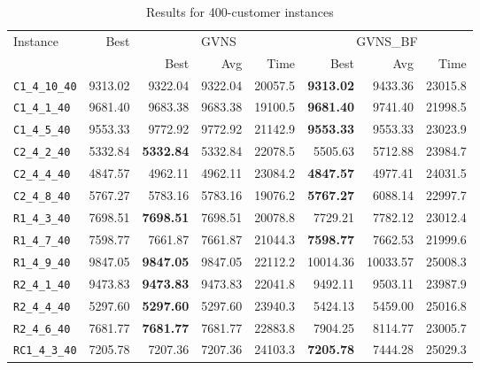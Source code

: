 \begin{table}[ht]
\centering
\small
\setlength{\tabcolsep}{5pt}
\caption{Results for 400-customer instances}
\vspace{4mm}
\begin{adjustbox}{width=\textwidth}
\begin{tabular}{l r r r r @{\hspace{8pt}} r r r @{\hspace{8pt}}}
\toprule
\multirow{2}{*}{Instance} & \multirow{2}{*}{Best} & \multicolumn{3}{c}{GVNS} & \multicolumn{3}{c}{GVNS\_BF} \\
\cmidrule(lr){3-5} \cmidrule(lr){6-8}
 &  & Best & Avg & Time & Best & Avg & Time \\
\midrule
\texttt{C1\_4\_10\_40} & 9313.02 & 9322.04 & 9322.04 & 20057.5 & \textbf{9313.02} & 9433.36 & 23015.8 \\
\texttt{C1\_4\_1\_40} & 9681.40 & 9683.38 & 9683.38 & 19100.5 & \textbf{9681.40} & 9741.40 & 21998.5 \\
\texttt{C1\_4\_5\_40} & 9553.33 & 9772.92 & 9772.92 & 21142.9 & \textbf{9553.33} & 9553.33 & 23023.9 \\
\texttt{C2\_4\_2\_40} & 5332.84 & \textbf{5332.84} & 5332.84 & 22078.5 & 5505.63 & 5712.88 & 23984.7 \\
\texttt{C2\_4\_4\_40} & 4847.57 & 4962.11 & 4962.11 & 23084.2 & \textbf{4847.57} & 4977.41 & 24031.5 \\
\texttt{C2\_4\_8\_40} & 5767.27 & 5783.16 & 5783.16 & 19076.2 & \textbf{5767.27} & 6088.14 & 22997.7 \\
\texttt{R1\_4\_3\_40} & 7698.51 & \textbf{7698.51} & 7698.51 & 20078.8 & 7729.21 & 7782.12 & 23012.4 \\
\texttt{R1\_4\_7\_40} & 7598.77 & 7661.87 & 7661.87 & 21044.3 & \textbf{7598.77} & 7662.53 & 21999.6 \\
\texttt{R1\_4\_9\_40} & 9847.05 & \textbf{9847.05} & 9847.05 & 22112.2 & 10014.36 & 10033.57 & 25008.3 \\
\texttt{R2\_4\_1\_40} & 9473.83 & \textbf{9473.83} & 9473.83 & 22041.8 & 9492.11 & 9503.11 & 23987.9 \\
\texttt{R2\_4\_4\_40} & 5297.60 & \textbf{5297.60} & 5297.60 & 23940.3 & 5424.13 & 5459.00 & 25016.8 \\
\texttt{R2\_4\_6\_40} & 7681.77 & \textbf{7681.77} & 7681.77 & 22883.8 & 7904.25 & 8114.77 & 23005.7 \\
\texttt{RC1\_4\_3\_40} & 7205.78 & 7207.36 & 7207.36 & 24103.3 & \textbf{7205.78} & 7444.28 & 25029.3 \\

\end{tabular}
\end{adjustbox}
\end{table}
